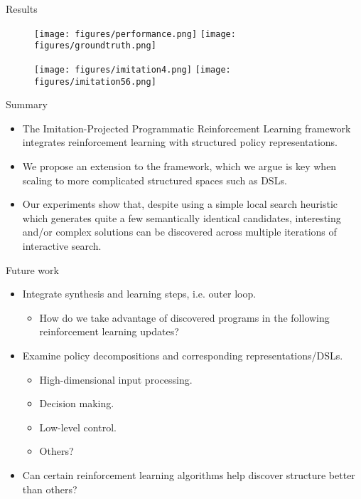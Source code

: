 \begin{frame}{Results}
    \begin{figure}
      \texttt{[image: figures/performance.png]}
      \texttt{[image: figures/groundtruth.png]}
      
      \texttt{[image: figures/imitation4.png]}
      \texttt{[image: figures/imitation56.png]}
    \end{figure}
    
\end{frame}

\begin{frame}{Summary}
    \begin{itemize}
        \item The Imitation-Projected Programmatic Reinforcement Learning framework integrates reinforcement learning with structured policy representations.
        \item We propose an extension to the framework, which we argue is key when scaling to more complicated structured spaces such as DSLs.
        \item Our experiments show that, despite using a simple local search heuristic which generates quite a few semantically identical candidates, interesting and/or complex solutions can be discovered across multiple iterations of interactive search.
    \end{itemize}
\end{frame}

\begin{frame}{Future work}
\begin{itemize}
    \item Integrate synthesis and learning steps, i.e. outer loop.
    \begin{itemize}
        \item How do we take advantage of discovered programs in the following reinforcement learning updates?
    \end{itemize}
    \item Examine policy decompositions and corresponding representations/DSLs.
    \begin{itemize}
        \item High-dimensional input processing.
        \item Decision making.
        \item Low-level control.
        \item Others?
    \end{itemize}
    \item Can certain reinforcement learning algorithms help discover structure better than others?
\end{itemize}
\end{frame}